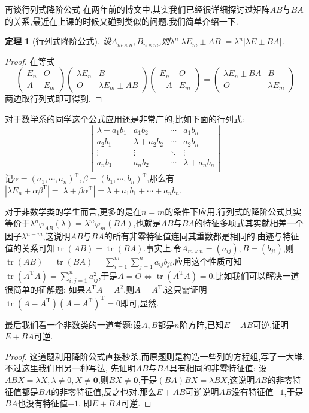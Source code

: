\documentclass[UTF8,no-math,12pt,openany,table,dvipsnames,svgnames]{book}
\newtheorem{theorem}{定理}
\DeclareMathOperator{\tr}{tr}
\begin{document}
\begin{MYBOX}[colbacktitle=blue]{再谈行列式降阶公式}\setlength{\parindent}{2em}
在两年前的博文中,其实我们已经很详细探讨过矩阵$AB$与$BA$的关系,最近在上课的时候又碰到类似的问题,我们简单介绍一下.
\begin{theorem}[行列式降阶公式]
设$A_{m\times n},B_{n\times m}$,则$\lambda^n|\lambda E_m\pm AB|=\lambda^n|\lambda E\pm BA|$.
\end{theorem}
\begin{proof}
在等式
\[\begin{pmatrix}
E_n&O\\A&E_m
\end{pmatrix}\begin{pmatrix}
\lambda E_n&B\\O&\lambda E_m\pm AB
\end{pmatrix}\begin{pmatrix}
E_n&O\\-A&E_m
\end{pmatrix}=\begin{pmatrix}
\lambda E_n\pm BA&B\\O&\lambda E_m
\end{pmatrix}\]
两边取行列式即可得到.
\end{proof}
对于数学系的同学这个公式应用还是非常广的,比如下面的行列式:
\[
\left| \begin{matrix}
	\lambda +a_1b_1&		a_1b_2&		\cdots&		a_1b_n\\
	a_2b_1&		\lambda+a_2b_2&		\cdots&		a_2b_n\\
	\vdots&		\vdots&		\ddots&		\vdots\\
	a_nb_1&		a_nb_2&		\cdots&		\lambda+a_nb_n\\
\end{matrix} \right|
\]
记$\alpha=(a_1,\cdots,a_n)^{\mathrm T},\beta=(b_1,\cdots,b_n)^{\mathrm T}$,那么有$|\lambda E_n+\alpha\beta^{\mathrm T}|=|\lambda+\beta\alpha^{\mathrm T}|=\lambda+a_1b_1+\cdots+a_nb_n$.

对于非数学类的学生而言,更多的是在$n=m$的条件下应用.行列式的降阶公式其实等价于$\lambda^n\varphi_{AB}(\lambda)=\lambda^m\varphi_m(BA)$,也就是$AB$与$BA$的特征多项式其实就相差一个因子$\lambda^{n-m}$,这说明$AB$与$BA$的所有非零特征值连同其重数都是相同的.由迹与特征值的关系可知$\tr(AB)=\tr(BA)$.事实上,令$A_{m\times n}=(a_{ij}),B=(b_{ji})$,则$\tr(AB)=\tr(BA)=\sum_{i=1}^m\sum_{j=1}^na_{ij}b_{ji}$.应用这个性质可知$\tr(A^{\mathrm T}A)=\sum_{i,j=1}^na_{ij}^2$,于是$A=O\Leftrightarrow \tr(A^{\mathrm T}A)=0$.比如我们可以解决一道很简单的征解题: 如果$A^{\mathrm T}A=A^2$,则$A=A^{\mathrm T}$.这只需证明$\tr(A-A^{\mathrm T})(A-A^{\mathrm T})^{\mathrm T}=0$即可,显然.

最后我们看一个非数类的一道考题:设$A,B$都是$n$阶方阵,已知$E+AB$可逆,证明$E+BA$可逆.
\begin{proof}
这道题利用降阶公式直接秒杀,而原题则是构造一些列的方程组,写了一大堆.不过这里我们用另一种写法, 先证明$AB$与$BA$具有相同的非零特征值: 设$ABX=\lambda X,\lambda\ne0,X\ne\boldsymbol 0$,则$BX\ne\boldsymbol0$,于是$(BA)BX=\lambda BX$,这说明$AB$的非零特征值都是$BA$的非零特征值,反之也对.那么$E+AB$可逆说明$AB$没有特征值$-1$,于是$BA$也没有特征值$-1$, 即$E+BA$可逆.
\end{proof}
\end{MYBOX}
\end{document}
